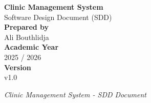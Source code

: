 \begin{titlepage}
	\centering
	
	\vspace*{2cm}
	
	{\Huge \textbf{Clinic Management System}}\\[0.5cm]
	
	{\Large Software Design Document (SDD)}\\[2cm]
	
	{\large \textbf{Prepared by}}\\[0.3cm]
	Ali Bouthlidja\\[1cm]
	
	{\large \textbf{Academic Year}}\\[0.3cm]
	2025 / 2026\\[1cm]
	
	{\large \textbf{Version}}\\[0.3cm]
	v1.0\\[2cm]
	
	\vfill
	
	{\large \textit{Clinic Management System - SDD Document}}
	
\end{titlepage}
